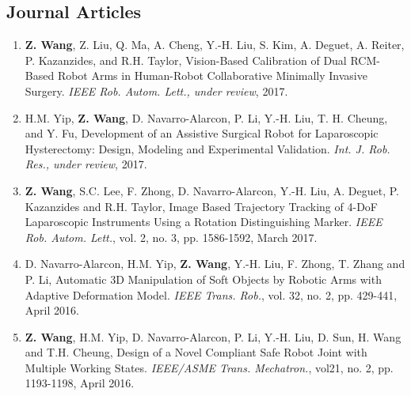 \documentclass[10pt,letterpaper]{article}
\begin{document}
\subsection*{Journal Articles}
\begin{enumerate}
\item \textbf{Z. Wang}, Z. Liu, Q. Ma, A. Cheng, Y.-H. Liu, S. Kim, A. Deguet, A. Reiter, P. Kazanzides, and R.H. Taylor,
  Vision-Based Calibration of Dual RCM-Based Robot Arms in Human-Robot Collaborative Minimally Invasive Surgery.
  \textit{IEEE Rob. Autom. Lett., under review}, 2017.
\item H.M. Yip, \textbf{Z. Wang}, D. Navarro-Alarcon, P. Li, Y.-H. Liu, T. H. Cheung, and Y. Fu,
  Development of an Assistive Surgical Robot for Laparoscopic Hysterectomy: Design, Modeling and Experimental Validation.
  \textit{Int. J. Rob. Res., under review}, 2017.
\item \textbf{Z. Wang}, S.C. Lee, F. Zhong, D. Navarro-Alarcon, Y.-H. Liu, A. Deguet, P. Kazanzides and R.H. Taylor,
  Image Based Trajectory Tracking of 4-DoF Laparoscopic Instruments Using a Rotation Distinguishing Marker.
  \textit{IEEE Rob. Autom. Lett.}, vol. 2, no. 3, pp. 1586-1592, March 2017.
\item D. Navarro-Alarcon, H.M. Yip, \textbf{Z. Wang}, Y.-H. Liu, F. Zhong, T. Zhang and P. Li,
  Automatic 3D Manipulation of Soft Objects by Robotic Arms with Adaptive Deformation Model.
  \textit{{IEEE} Trans. Rob.}, vol. 32, no. 2, pp. 429-441, April 2016.
\item \textbf{Z. Wang}, H.M. Yip, D. Navarro-Alarcon, P. Li, Y.-H. Liu, D. Sun, H. Wang and T.H. Cheung,
  Design of a Novel Compliant Safe Robot Joint with Multiple Working States.
  \textit{{IEEE/ASME} Trans. Mechatron.}, vol21, no. 2, pp. 1193-1198, April 2016.
\end{enumerate}
\end{document}
